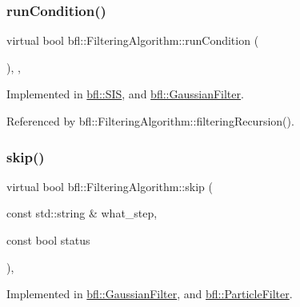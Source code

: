 \mbox{\label{classbfl_1_1FilteringAlgorithm_a5fc12882356f6906b102fbfff2bc4b7c}} 
\subsubsection{\texorpdfstring{run\+Condition()}{runCondition()}}
{\footnotesize\ttfamily virtual bool bfl\+::\+Filtering\+Algorithm\+::run\+Condition (\begin{DoxyParamCaption}{ }\end{DoxyParamCaption})\hspace{0.3cm}{\ttfamily [protected]}, {}, {\ttfamily [inherited]}}



Implemented in \mbox{\hyperlink{classbfl_1_1SIS_a669ac8eb19f6797f2735b94074727e8f}{bfl\+::\+S\+IS}}, and \mbox{\hyperlink{classbfl_1_1GaussianFilter_acf6902f6156c573560b57f10c1992b8a}{bfl\+::\+Gaussian\+Filter}}.



Referenced by bfl\+::\+Filtering\+Algorithm\+::filtering\+Recursion().

\mbox{\label{classbfl_1_1FilteringAlgorithm_ac8a718a614905d89d6a43bbbc70d68b2}} 
\subsubsection{\texorpdfstring{skip()}{skip()}}
{\footnotesize\ttfamily virtual bool bfl\+::\+Filtering\+Algorithm\+::skip (\begin{DoxyParamCaption}\item[{const std\+::string \&}]{what\+\_\+step,  }\item[{const bool}]{status }\end{DoxyParamCaption})\hspace{0.3cm}{\ttfamily [pure virtual]}, {\ttfamily [inherited]}}



Implemented in \mbox{\hyperlink{classbfl_1_1GaussianFilter_a3ca79ee1451863d898baeea6a74ababd}{bfl\+::\+Gaussian\+Filter}}, and \mbox{\hyperlink{classbfl_1_1ParticleFilter_a2d7a5e7aaad179037273d35be229056d}{bfl\+::\+Particle\+Filter}}.

